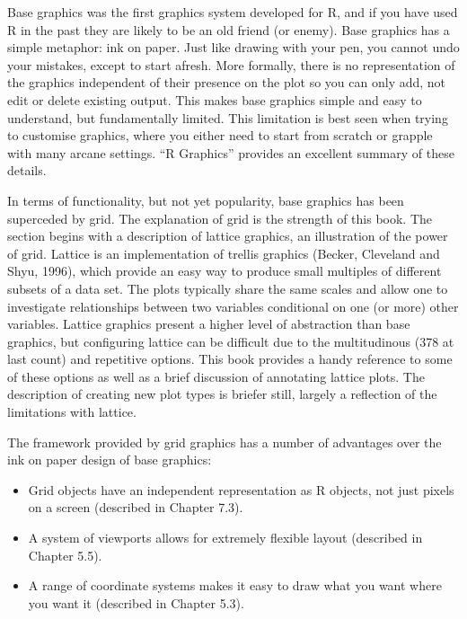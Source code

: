 \documentclass[12pt]{article}
\begin{document}
Base graphics was the first graphics system developed for R, and if
you have used R in the past they are likely to be an old friend (or
enemy). Base graphics has a simple metaphor: ink on paper. Just like
drawing with your pen, you cannot undo your mistakes, except to start
afresh. More formally, there is no representation of the graphics
independent of their presence on the plot so you can only add, not
edit or delete existing output. This makes base graphics simple and
easy to understand, but fundamentally limited.  This limitation is
best seen when trying to customise graphics, where you either need to
start from scratch or grapple with many arcane settings. ``R
Graphics'' provides an excellent summary of these details.

In terms of functionality, but not yet popularity, base graphics has
been superceded by grid. The explanation of grid is the strength of
this book.  The section begins with a description of lattice graphics,
an illustration of the power of grid.  Lattice is an implementation of
trellis graphics (Becker, Cleveland and Shyu, 1996), which provide an
easy way to produce small multiples of different subsets of a data
set. The plots typically share the same scales and allow one to
investigate relationships between two variables conditional on one (or
more) other variables.  Lattice graphics present a higher level of
abstraction than base graphics, but configuring lattice can be
difficult due to the multitudinous (378 at last count) and repetitive
options.  This book provides a handy reference to some of these
options as well as a brief discussion of annotating lattice plots.
The description of creating new plot types is briefer still, largely a
reflection of the limitations with lattice.

The framework provided by grid graphics has a number of advantages
over the ink on paper design of base graphics:

\begin{itemize}

\item Grid objects have an independent representation as R objects,
not just pixels on a screen (described in Chapter 7.3).

\item A system of viewports allows for extremely flexible layout
(described in Chapter 5.5).

\item A range of coordinate systems makes it easy to draw what you
want where you want it (described in Chapter 5.3).

\end{itemize}
\end{document}
